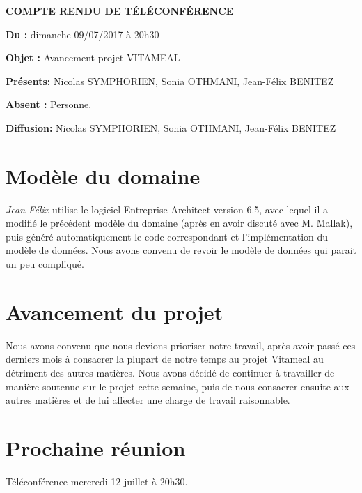 \documentclass[11pt,a4paper,french,twoside,openright]{article}
\begin{document}
\pagestyle{fancy}

\begin{center}\bfseries\Huge
COMPTE RENDU DE TÉLÉCONFÉRENCE
\end{center}

\textbf{Du      :} dimanche 09/07/2017 à 20h30

\textbf{Objet   :} Avancement projet VITAMEAL

\textbf{Présents:} Nicolas SYMPHORIEN, Sonia OTHMANI, Jean-Félix BENITEZ

\textbf{Absent :} Personne.

\textbf{Diffusion:} Nicolas SYMPHORIEN, Sonia OTHMANI, Jean-Félix BENITEZ

\hrulefill

\section{Modèle du domaine}
\emph{Jean-Félix} utilise le logiciel Entreprise Architect version 6.5, avec lequel il a modifié le précédent modèle du domaine (après en avoir discuté avec M. Mallak), puis généré automatiquement le code correspondant et l'implémentation du modèle de données. Nous avons convenu de revoir le modèle de données qui parait un peu compliqué.

\section{Avancement du projet}
Nous avons convenu que nous devions prioriser notre travail, après avoir passé ces derniers mois à consacrer la plupart de notre temps au projet Vitameal au détriment des autres matières. Nous avons décidé de continuer à travailler de manière soutenue sur le projet cette semaine, puis de nous consacrer ensuite aux autres matières et de lui affecter une charge de travail raisonnable.

\section{Prochaine réunion}
Téléconférence mercredi 12  juillet à 20h30.

\label{LastPage}
\end{document}
